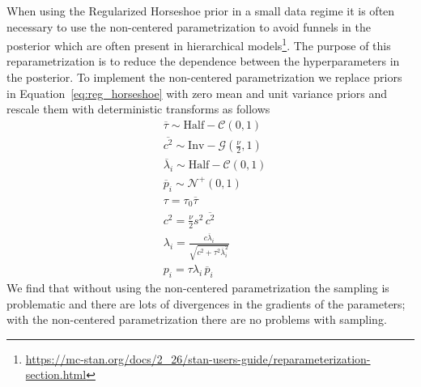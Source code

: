 \documentclass[modern]{aastex62}
\begin{document}
When using the Regularized Horseshoe prior in a small data regime it is often necessary to use the non-centered parametrization to avoid funnels in the posterior which are often present in hierarchical models\footnote{\url{https://mc-stan.org/docs/2_26/stan-users-guide/reparameterization-section.html}}.
The purpose of this reparametrization is to reduce the dependence between the hyperparameters in the posterior.
To implement the non-centered parametrization we replace priors in Equation~\ref{eq:reg_horseshoe} with zero mean and unit variance priors and rescale them with deterministic transforms as follows
\begin{equation}
\begin{aligned}
    &\overline{\tau} \sim \mathrm{Half}-\mathcal{C}\left(0, 1\right)\\
    &\overline{c^{2}}  \sim \mathrm{Inv}-\mathcal{G}\left(\frac{\nu}{2}, 1\right) \\
    &\overline{\lambda}_{i}  \sim \mathrm{Half}-\mathcal{C}(0,1) \\
    &\overline{p}_{i}  \sim \mathcal{N}^+\left(0, 1\right)\\
    &\tau=\tau_0\overline{\tau}\\
    &c^2=\frac{\nu}{2}s^2\,\overline{c^2}\\
    &\lambda_{i} =\frac{c \overline{\lambda}_{i}}{\sqrt{c^{2}+\tau^{2} \overline{\lambda}_{i}^{2}}} \\
    &p_i = \tau\lambda_i\,\overline{p}_i
\end{aligned}
    \label{eq:reg_horseshoe_noncentered}
\end{equation}
We find that without using the non-centered parametrization the sampling is problematic and there are lots of divergences in the gradients of the parameters; with the non-centered parametrization there are no problems with sampling.

\clearpage


\end{document}
